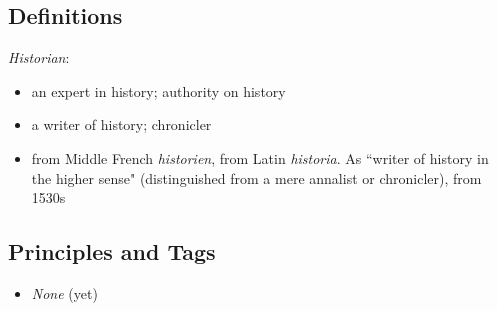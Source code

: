 \documentclass[12pt]{report}
\begin{document}
\subsection{Definitions\label{intro:DFN2}}
\emph{Historian}:
\begin{itemize}
\item an expert in history; authority on history
\item a writer of history; chronicler
\item from Middle French \emph{historien}, from Latin \emph{historia}. As ``writer of history in the higher sense" (distinguished from a mere annalist or chronicler), from 1530s
\end{itemize} 

\subsection{Principles and Tags\label{intro:principles2}}
\begin{itemize}
\item \emph{None} (yet)
\end{itemize}
\end{document}
